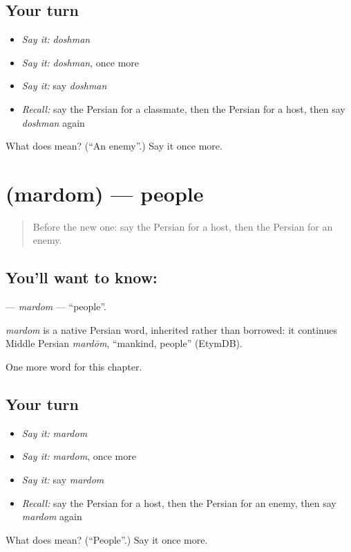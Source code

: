 \subsection*{Your turn}
\begin{itemize}
\raggedright
  \item \emph{Say it:} \emph{doshman}
  \item \emph{Say it:} \emph{doshman}, once more
  \item \emph{Say it:} say \emph{doshman}
  \item \emph{Recall:} say the Persian for a classmate, then the Persian for a host, then say \emph{doshman} again
\end{itemize}

\begin{tcolorbox}[breakable,colback=teal!4,colframe=teal!35!black,title={Before you move on}]
What does  mean? (\textquotedblleft{}An enemy\textquotedblright{}.) Say it once more.
\end{tcolorbox}
\section[\texorpdfstring{\fa{مردم} (mardom)}{مردم (mardom)}]{ (mardom) — people}

\label{lesson:FA-C169-mardom}



\begin{quote}
Before the new one: say the Persian for a host, then the Persian for an enemy.
\end{quote}

\subsection*{You'll want to know: }
\textbf{} — \emph{mardom} — \textquotedblleft{}people\textquotedblright{}.

\begin{cousinweb}
\emph{mardom} is a native Persian word, inherited rather than borrowed: it continues Middle Persian \emph{mardōm}, \textquotedblleft{}mankind, people\textquotedblright{} (EtymDB).
\end{cousinweb}

\begin{grammarlens}[title={What you've built}]
One more word for this chapter.
\end{grammarlens}

\subsection*{Your turn}
\begin{itemize}
\raggedright
  \item \emph{Say it:} \emph{mardom}
  \item \emph{Say it:} \emph{mardom}, once more
  \item \emph{Say it:} say \emph{mardom}
  \item \emph{Recall:} say the Persian for a host, then the Persian for an enemy, then say \emph{mardom} again
\end{itemize}

\begin{tcolorbox}[breakable,colback=teal!4,colframe=teal!35!black,title={Before you move on}]
What does  mean? (\textquotedblleft{}People\textquotedblright{}.) Say it once more.
\end{tcolorbox}
